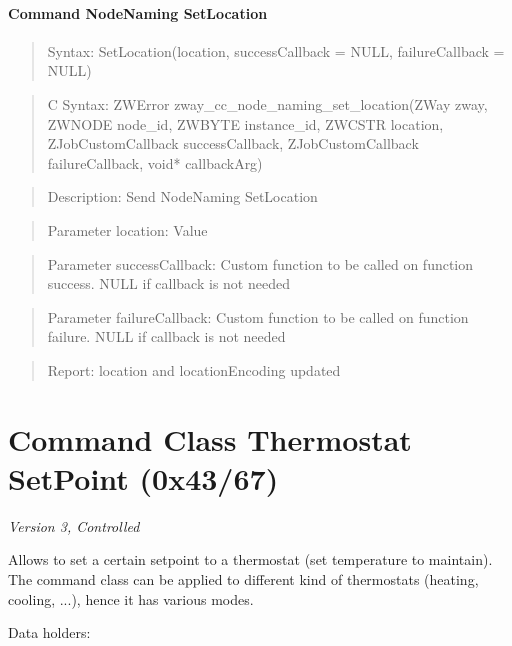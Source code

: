 \paragraph{Command NodeNaming SetLocation}
\begin{quote}Syntax: SetLocation(location, successCallback = NULL, failureCallback = NULL)\end{quote}
\begin{quote}C Syntax: ZWError zway\_cc\_node\_naming\_set\_location(ZWay zway, ZWNODE node\_id, ZWBYTE instance\_id, ZWCSTR location, ZJobCustomCallback successCallback, ZJobCustomCallback failureCallback, void* callbackArg)\end{quote}
\begin{quote}Description: Send NodeNaming SetLocation\end{quote}
\begin{quote}Parameter location: Value\end{quote}
\begin{quote}Parameter successCallback: Custom function to be called on function success. NULL if callback is not needed\end{quote}
\begin{quote}Parameter failureCallback: Custom function to be called on function failure. NULL if callback is not needed\end{quote}
\begin{quote}Report: location and locationEncoding updated\end{quote}


\section{Command Class Thermostat SetPoint (0x43/67)}

\textit{Version 3, Controlled}
\newline

Allows to set a certain setpoint to a thermostat (set temperature to maintain). The command class can be applied to different kind of thermostats (heating, cooling, ...), hence it has various modes.
\newline

\noindent
Data holders:

